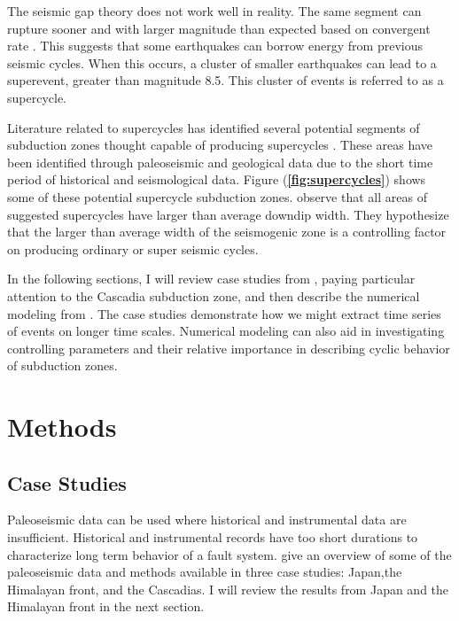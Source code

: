 \documentclass[]{proposalnsf}
\begin{document}
The seismic gap theory does not work well in reality. The same segment can rupture sooner and with larger magnitude than expected based on convergent rate \citep{Nocquet2016}. This suggests that some earthquakes can borrow energy from previous seismic cycles. When this occurs, a cluster of smaller earthquakes can lead to a superevent, greater than magnitude 8.5. This cluster of events is referred to as a supercycle. 

Literature related to supercycles has identified several potential segments of subduction zones thought capable of producing supercycles \citep{Goldfinger2013, Herrendorfer2015, Nocquet2016}. These areas have been identified through paleoseismic and geological data due to the short time period of historical and seismological data. Figure ({\bf \ref{fig:supercycles}}) shows some of these potential supercycle subduction zones. \citet{Herrendorfer2015} observe that all areas of suggested supercycles have larger than average downdip width. They hypothesize that the larger than average width of the seismogenic zone is a controlling factor on producing ordinary or super seismic cycles. 

In the following sections, I will review case studies from \citet{Goldfinger2013}, paying particular attention to the Cascadia subduction zone, and then describe the numerical modeling from \citet{Herrendorfer2015}. The case studies demonstrate how we might extract time series of events on longer time scales. Numerical modeling can also aid in investigating controlling parameters and their relative importance in describing cyclic behavior of subduction zones.


\section{Methods}

\subsection{Case Studies}

Paleoseismic data can be used where historical and instrumental data are insufficient. Historical and instrumental records have too short durations to characterize long term behavior of a fault system. \citet{Goldfinger2013} give an overview of some of the paleoseismic data and methods available in three case studies: Japan,the Himalayan front, and the Cascadias. I will review the results from Japan and the Himalayan front in the next section.
\end{document}
